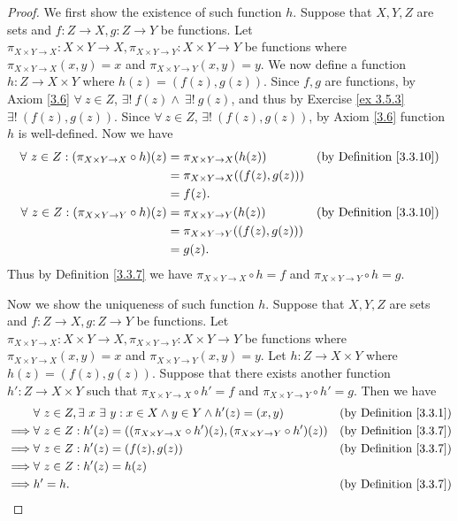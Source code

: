 \begin{proof}
We first show the existence of such function \(h\).
Suppose that \(X, Y, Z\) are sets and \(f : Z \to X, g : Z \to Y\) be functions.
Let \(\pi_{X \times Y \to X} : X \times Y \to X, \pi_{X \times Y \to Y} : X \times Y \to Y\) be functions where \(\pi_{X \times Y \to X}(x, y) = x\) and \(\pi_{X \times Y \to Y}(x, y) = y\).
We now define a function \(h : Z \to X \times Y\) where \(h(z) = (f(z), g(z))\).
Since \(f, g\) are functions, by Axiom \ref{3.6} \(\forall\ z \in Z\), \(\exists!\ f(z) \land \ \exists!\ g(z)\), and thus by Exercise \ref{ex 3.5.3} \(\exists!\ (f(z), g(z))\).
Since \(\forall\ z \in Z\), \(\exists!\ (f(z), g(z))\), by Axiom \ref{3.6} function \(h\) is well-defined.
Now we have
\begin{align*}
\forall\ z \in Z : (\pi_{X \times Y \to X} \circ h)(z) &= \pi_{X \times Y \to X}(h(z)) & \text{(by Definition \ref{3.3.10})} \\
&= \pi_{X \times Y \to X}((f(z), g(z))) \\
&= f(z). \\
\forall\ z \in Z : (\pi_{X \times Y \to Y} \circ h)(z) &= \pi_{X \times Y \to Y}(h(z)) & \text{(by Definition \ref{3.3.10})} \\
&= \pi_{X \times Y \to Y}((f(z), g(z))) \\
&= g(z).
\end{align*}
Thus by Definition \ref{3.3.7} we have \(\pi_{X \times Y \to X} \circ h = f\) and \(\pi_{X \times Y \to Y} \circ h = g\).

Now we show the uniqueness of such function \(h\).
Suppose that \(X, Y, Z\) are sets and \(f : Z \to X, g : Z \to Y\) be functions.
Let \(\pi_{X \times Y \to X} : X \times Y \to X, \pi_{X \times Y \to Y} : X \times Y \to Y\) be functions where \(\pi_{X \times Y \to X}(x, y) = x\) and \(\pi_{X \times Y \to Y}(x, y) = y\).
Let \(h : Z \to X \times Y\) where \(h(z) = (f(z), g(z))\).
Suppose that there exists another function \(h' : Z \to X \times Y\) such that \(\pi_{X \times Y \to X} \circ h' = f\) and \(\pi_{X \times Y \to Y} \circ h' = g\).
Then we have
\begin{align*}
& \forall\ z \in Z, \exists\ x \ \exists\ y : x \in X \land y \in Y \land h'(z) = (x, y) & \text{(by Definition \ref{3.3.1})} \\
\implies & \forall\ z \in Z : h'(z) = ((\pi_{X \times Y \to X} \circ h')(z), (\pi_{X \times Y \to Y} \circ h')(z)) & \text{(by Definition \ref{3.3.7})} \\
\implies & \forall\ z \in Z : h'(z) = (f(z), g(z)) & \text{(by Definition \ref{3.3.7})} \\
\implies & \forall\ z \in Z : h'(z) = h(z) \\
\implies & h' = h. & \text{(by Definition \ref{3.3.7})}
\end{align*}
\end{proof}


